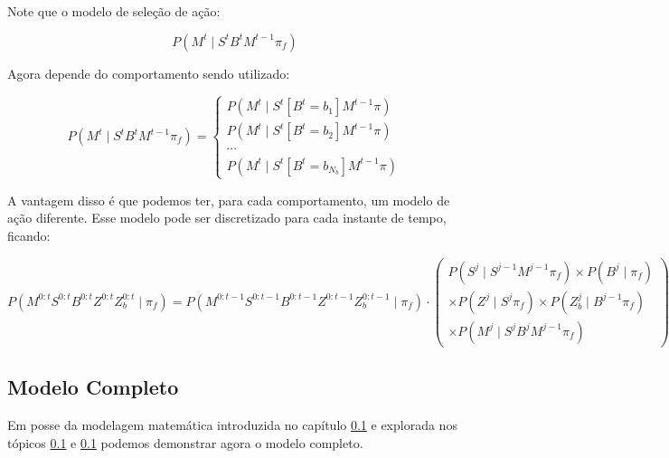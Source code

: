 Note que o modelo de seleção de ação:

\begin{equation}
	P \left( M^t \mid S^t B^t M^{t-1} \pi_f \right)
\end{equation}

Agora depende do comportamento sendo utilizado:

\begin{equation}
    P \left( M^t \mid S^t B^t M^{t-1} \pi_f \right) = 
        \left\{
            \begin{array}{l}
                P \left( M^t \mid S^t \left[ B^t=b_1 \right] M^{t-1} \pi \right) \\
                P \left( M^t \mid S^t \left[ B^t=b_2 \right] M^{t-1} \pi \right) \\
                \cdots \\
                P \left( M^t \mid S^t \left[ B^t=b_{N_b} \right] M^{t-1} \pi \right)
            \end{array}
        \right.
\end{equation}

A vantagem disso é que podemos ter, para cada comportamento, um modelo de ação diferente. Esse modelo pode ser discretizado para cada instante de tempo, ficando:

\begin{equation}
        P \left( M^{0: t} S^{0: t} B^{0: t} Z^{0: t} Z_b^{0: t} \mid \pi_f \right) = P \left( M^{0: t-1} S^{0: t-1} B^{0: t-1} Z^{0: t-1} Z_b^{0: t-1} \mid \pi_f \right) \cdot 
        \left(
            \begin{array}{l}
                P \left( S^j \mid S^{j -1} M^{j -1} \pi_f \right) \times P \left( B^j \mid \pi_f \right) \\
                \times P \left( Z^j \mid S^j \pi_f \right) \times P \left( Z_b^j \mid B^{j-1} \pi_f \right) \\
                \times P \left( M^j \mid S^j B^j M^{j -1} \pi_f \right)
            \end{array}
        \right)
\end{equation}


\subsection{Modelo Completo}

Em posse da modelagem matemática introduzida no capítulo \ref{} e explorada nos tópicos \ref{} e \ref{} podemos demonstrar agora o modelo completo.

